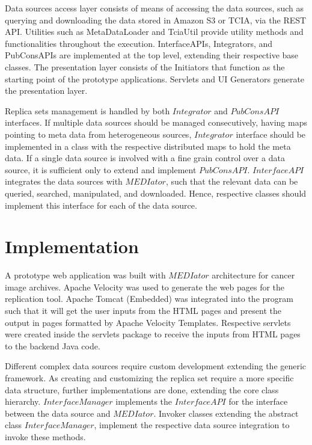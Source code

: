 \documentclass[conference]{IEEEtran}
\begin{document}
Data sources access layer consists of means of accessing the data sources, such as querying and downloading the data stored in Amazon S3 or TCIA, via the REST API. Utilities such as MetaDataLoader and TciaUtil provide utility methods and functionalities throughout the execution. InterfaceAPIs, Integrators, and PubConsAPIs are implemented at the top level, extending their respective base classes. The presentation layer consists of the Initiators that function as the starting point of the prototype applications. Servlets and UI Generators generate the presentation layer. 

Replica sets management is handled by both $Integrator$ and $PubConsAPI$ interfaces. If multiple data sources should be managed consecutively, having maps pointing to meta data from heterogeneous sources, $Integrator$ interface should be implemented in a class with the respective distributed maps to hold the meta data. If a single data source is involved with a fine grain control over a data source, it is sufficient only to extend and implement $PubConsAPI$. $InterfaceAPI$ integrates the data sources with $MEDIator$, such that the relevant data can be queried, searched, manipulated, and downloaded. Hence, respective classes should implement this interface for each of the data source. 


\section{Implementation}
A prototype web application was built with $MEDIator$ architecture for cancer image archives. Apache Velocity was used to generate the web pages for the replication tool. Apache Tomcat (Embedded) was integrated into the program such that it will get the user inputs from the HTML pages and present the output in pages formatted by Apache Velocity Templates. Respective servlets were created inside the servlets package to receive the inputs from HTML pages to the backend Java code.

Different complex data sources require custom development extending the generic framework. As creating and customizing the replica set require a more specific data structure, further implementations are done, extending the core class hierarchy. $InterfaceManager$ implements the $InterfaceAPI$ for the interface between the data source and $MEDIator$. Invoker classes extending the abstract class $InterfaceManager$, implement the respective data source integration to invoke these methods. 
\end{document}
